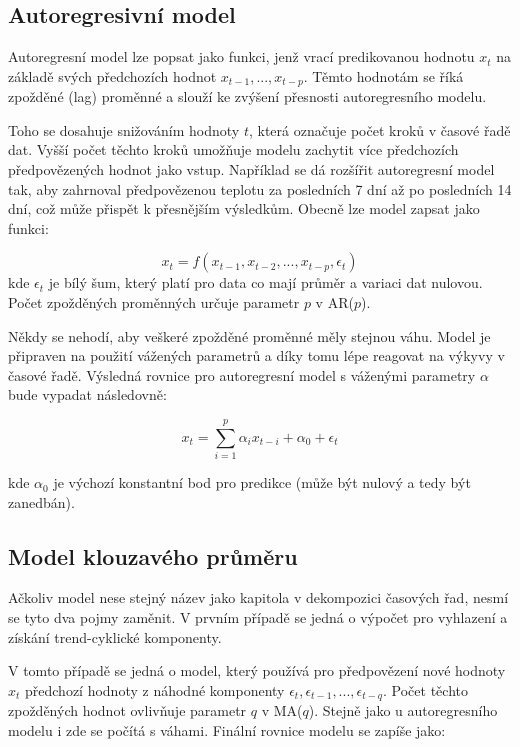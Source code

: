\documentclass[FM,BP,fonts]{tulthesis}
\begin{document}
\subsection{Autoregresivní model}
Autoregresní model lze popsat jako funkci, jenž vrací predikovanou hodnotu $x_t$ na základě svých předchozích hodnot $x_{t-1}, ...,  x_{t-p}$. Těmto hodnotám se říká zpožděné (lag) proměnné a slouží ke zvýšení přesnosti autoregresního modelu. 

Toho se dosahuje snižováním hodnoty $t$, která označuje počet kroků v časové řadě dat. Vyšší počet těchto kroků umožňuje modelu zachytit více předchozích předpovězených hodnot jako vstup. Například se dá rozšířit autoregresní model tak, aby zahrnoval předpovězenou teplotu za posledních 7 dní až po posledních 14 dní, což může přispět k přesnějším výsledkům. \cite{amazon} Obecně lze model zapsat jako funkci: 

\begin{equation}
	x_t = f(x_{t-1}, x_{t-2}, ..., x_{t-p}, \epsilon_t)
\end{equation}
kde $\epsilon_t$ je bílý šum, který platí pro data co mají průměr a variaci dat nulovou. Počet zpožděných proměnných určuje parametr $p$ v AR($p$).

Někdy se nehodí, aby veškeré zpožděné proměnné měly stejnou váhu. Model je připraven na použití vážených parametrů a díky tomu lépe reagovat na výkyvy v časové řadě. Výsledná rovnice pro autoregresní model s váženými parametry $\alpha$ bude vypadat následovně: 

\begin{equation}
	x_t =    \sum_{i=1}^{p}\alpha_ix_{t-i} + \alpha_0 + \epsilon_t
\end{equation}

kde $\alpha_0$  je výchozí konstantní bod pro predikce (může být nulový a tedy být zanedbán). 

\subsection{Model klouzavého průměru}
Ačkoliv model nese stejný název jako kapitola v dekompozici časových řad, nesmí se tyto dva pojmy zaměnit. V prvním případě se jedná o výpočet pro vyhlazení a získání trend-cyklické komponenty. 

V tomto případě se jedná o model, který používá pro předpovězení nové hodnoty $x_t$ předchozí hodnoty z náhodné komponenty $\epsilon_t, \epsilon_{t-1}, ..., \epsilon_{t-q}$. Počet těchto zpožděných hodnot ovlivňuje parametr $q$ v MA($q$). Stejně jako u autoregresního modelu i zde se počítá s váhami. Finální rovnice modelu se zapíše jako: 
\end{document}

